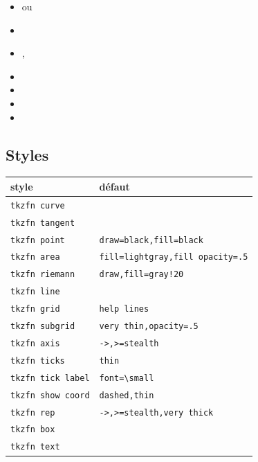 \begin{itemize}
\item {} ou 
\item {}
\item {}, 
\item {}
\item {}
\item {}
\item {}
\end{itemize}

\subsection{Styles}

\begin{center}
\begin{tabular}{ll}
\toprule
style & défaut \\
\midrule
\texttt{tkzfn curve} & \\
\texttt{tkzfn tangent} & \\
\texttt{tkzfn point} & \texttt{draw=black,fill=black} \\
\texttt{tkzfn area} & \texttt{fill=lightgray,fill opacity=.5} \\
\texttt{tkzfn riemann} & \texttt{draw,fill=gray!20} \\
\texttt{tkzfn line} & \\
\texttt{tkzfn grid} & \texttt{help lines} \\
\texttt{tkzfn subgrid} & \texttt{very thin,opacity=.5} \\
\texttt{tkzfn axis} & \texttt{->,>=stealth} \\
\texttt{tkzfn ticks} & \texttt{thin} \\
\texttt{tkzfn tick label} & \texttt{font=\textbackslash small} \\
\texttt{tkzfn show coord} & \texttt{dashed,thin} \\
\texttt{tkzfn rep} & \texttt{->,>=stealth,very thick} \\
\texttt{tkzfn box} & \\
\texttt{tkzfn text} & \\
\bottomrule
\end{tabular}
\end{center}

\endinput
